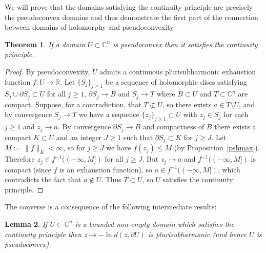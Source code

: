 \documentclass[11pt,a4paper, final, twoside]{article}
\newtheorem{theorem}{Theorem}
\newtheorem{lemma}[theorem]{Lemma}
\numberwithin{equation}{section}
\newcommand{\C}{\mathbb C}
\newcommand{\R}{\mathbb R}
\newcommand{\bd}{\partial}
\newcommand{\emetric}{d}
\begin{document}
We will prove that the domains satisfying the continuity principle are precisely the pseudoconvex domains and thus demonstrate the first part of the connection between domains
of holomorphy and pseudoconvexity. 
\begin{theorem}
\label{pscty}
If a domain $U\subset\C^n$ is pseudoconvex then it satisfies the continuity principle.
\end{theorem}
\begin{proof}
By pseudoconvexity, $U$ admits a continuous plurisubharmonic exhaustion function $f\colon U\to\R$. Let $\{S_j\}_{j\geq 1}$ be a sequence of holomorphic discs
satisfying $S_j\cup \bd S_j\subset U$ for all $j\geq 1$, $\bd S_j\to B$ and $S_j\to T$ where $B\subset U$ and $T\subset \C^n$ are compact. Suppose, for a contradiction, that $T\not\subset U$,
so there exists $a\in T\setminus U$, and by convergence $S_j\to T$ we have a sequence $\{z_j\}_{j\geq 1}\subset U$ with $z_j\in S_j$ for each $j\geq 1$ and $z_j\to a$. 
By convergence $\bd S_j\to B$ and compactness of $B$ there exists a compact $K\subset U$ and an integer $J\geq 1$ such that $\bd S_j\subset K$ for $j\geq J$. Let $M:=\|f\|_K<\infty$,
so for $j\geq J$ we have $f(z_j)\leq M$ (by Proposition~\ref{pshmax}).
Therefore $z_j\in f^{-1}((-\infty,M])$
for all $j\geq J$. But $z_j\to a$ and $f^{-1}((-\infty,M])$ is compact (since $f$ is an exhaustion function), so $a\in f^{-1}((-\infty,M])$, which contradicts the fact that $a\not\in U$.
Thus $T\subset U$, so $U$ satisfies the continuity principle.
\end{proof}
The converse is a consequence of the following intermediate results:
\begin{lemma}
\label{gaylemma}
If $U\subset\C^n$ is a bounded non-empty domain which satisfies the continuity principle then $z\mapsto -\ln\emetric(z,\bd U)$ is plurisubharmonic (and hence $U$ is pseudoconvex).
\end{lemma}
\end{document}
